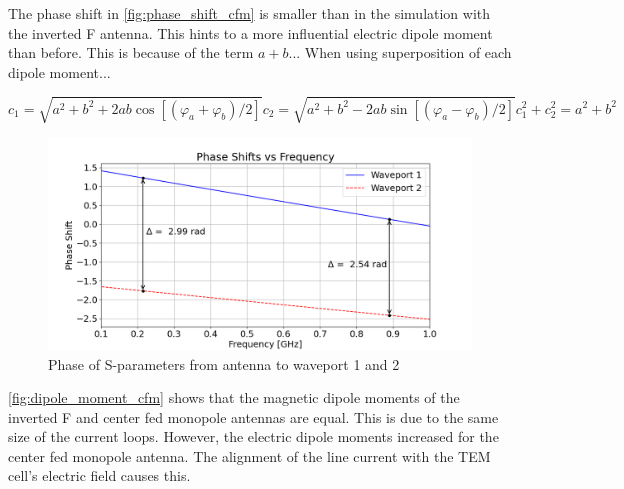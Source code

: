 The phase shift in \autoref{fig:phase_shift_cfm} is smaller than in the simulation with the inverted F antenna. This hints to a more influential electric dipole moment than before. This is because of the term $a+b$... When using superposition of each dipole moment...

\begin{subequations}
    \begin{equation}
        c_1 = \sqrt{a^2+b^2+2ab\cos{\left[ (\varphi_a + \varphi_b) / 2 \right]}}
    \end{equation}
        \begin{equation}
        c_2 = \sqrt{a^2+b^2-2ab\sin{\left[ (\varphi_a - \varphi_b) / 2 \right]}}
    \end{equation}
    \begin{equation}
        c_1^2+c_2^2= a^2+b^2
    \end{equation}
\end{subequations}
    

\begin{figure}[h]
    \centering
    \includegraphics[width=1\linewidth]{Documentation//content//30_simulations//img/phase_shift_cfm.png}
    \caption{Phase of S-parameters from antenna to waveport 1 and 2}
    \label{fig:phase_shift_cfm}
\end{figure}

\autoref{fig:dipole_moment_cfm} shows that the magnetic dipole moments of the inverted F and center fed monopole antennas are equal. This is due to the same size of the current loops. However, the electric dipole moments increased for the center fed monopole antenna. The alignment of the line current with the TEM cell's electric field causes this.

